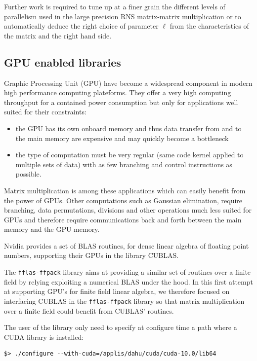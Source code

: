 Further work is required to tune up at a finer grain the different
levels of parallelism used in the large precision RNS matrix-matrix
multiplication or to automatically deduce the right choice of 
parameter $\ell$ from the characteristics of the matrix and the right
hand side.

\subsection{GPU enabled libraries}

Graphic Processing Unit (GPU) have become a widespread component in modern high performance computing plateforms. They
offer a very high computing throughput for a contained power consumption but only for applications well suited for their
constraints:
\begin{itemize}
\item the GPU has its own onboard memory and thus data transfer from and to the main memory are expensive and may
  quickly become a bottleneck
\item the type of computation must be very regular (same code kernel applied to multiple sets of data) with as few
  branching and control instructions as possible.
\end{itemize}

Matrix multiplication is among these applications which can easily benefit from the power of GPUs. Other computations
such as Gaussian elimination, require branching, data permutations, divisions and other operations much less suited for
GPUs and therefore require communications back and forth between the main memory and the GPU memory.

Nvidia provides a set of BLAS routines, for dense linear algebra of floating point numbers, supporting their GPUs in the
library CUBLAS.

The \texttt{fflas-ffpack} library aims at providing a similar set of routines over a finite field by relying exploiting a
numerical BLAS under the hood. In this first attempt at supporting GPU's for finite field linear algebra, we therefore
focused on interfacing CUBLAS in the \texttt{fflas-ffpack} library so that matrix multiplication over a finite field
could benefit from CUBLAS' routines.

The user of the library only need to specify at configure time a path where a CUDA library is installed:
\begin{verbatim}
$> ./configure --with-cuda=/applis/dahu/cuda/cuda-10.0/lib64
\end{verbatim}

